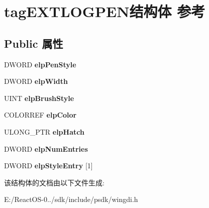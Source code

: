 \hypertarget{structtag_e_x_t_l_o_g_p_e_n}{}\section{tag\+E\+X\+T\+L\+O\+G\+P\+E\+N结构体 参考}
\label{structtag_e_x_t_l_o_g_p_e_n}
\subsection*{Public 属性}
\begin{DoxyCompactItemize}
\item 
\mbox{\label{structtag_e_x_t_l_o_g_p_e_n_a9fc9ff5e41c1e6e753225c9aa418968a}} 
D\+W\+O\+RD {\bfseries elp\+Pen\+Style}
\item 
\mbox{\label{structtag_e_x_t_l_o_g_p_e_n_a5c1e7561f5c0afb48b434f2cdd4a245e}} 
D\+W\+O\+RD {\bfseries elp\+Width}
\item 
\mbox{\label{structtag_e_x_t_l_o_g_p_e_n_aa246268d9da9c159dd6590680eced09d}} 
U\+I\+NT {\bfseries elp\+Brush\+Style}
\item 
\mbox{\label{structtag_e_x_t_l_o_g_p_e_n_af3900bcc8c7a125503456112c15378d9}} 
C\+O\+L\+O\+R\+R\+EF {\bfseries elp\+Color}
\item 
\mbox{\label{structtag_e_x_t_l_o_g_p_e_n_ae7f8f1dcf7b542be5d87f4e7ac4aeed4}} 
U\+L\+O\+N\+G\+\_\+\+P\+TR {\bfseries elp\+Hatch}
\item 
\mbox{\label{structtag_e_x_t_l_o_g_p_e_n_a07bf54d530694e865731c4dab0b209fe}} 
D\+W\+O\+RD {\bfseries elp\+Num\+Entries}
\item 
\mbox{\label{structtag_e_x_t_l_o_g_p_e_n_ad0ca058e247649866d7391d63cec595f}} 
D\+W\+O\+RD {\bfseries elp\+Style\+Entry} \mbox{[}1\mbox{]}
\end{DoxyCompactItemize}


该结构体的文档由以下文件生成\+:\begin{DoxyCompactItemize}
\item 
E\+:/\+React\+O\+S-\/0../sdk/include/psdk/wingdi.\+h\end{DoxyCompactItemize}
